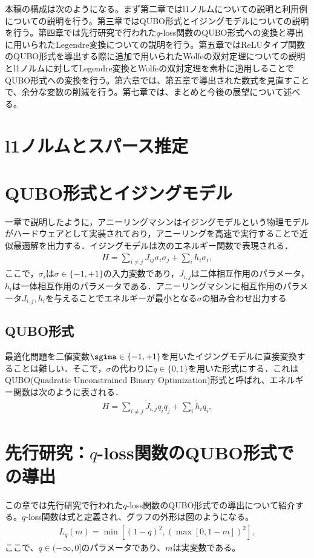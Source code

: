 \documentclass[paper]{ieicej}
\begin{document}
本稿の構成は次のようになる。まず第二章ではl1ノルムについての説明と利用例についての説明を行う。第三章ではQUBO形式とイジングモデルについての説明を行う。第四章では先行研究で行われた$q$-loss関数のQUBO形式への変換と導出に用いられたLegendre変換についての説明を行う。第五章ではReLUタイプ関数のQUBO形式を導出する際に追加で用いられたWolfeの双対定理についての説明とl1ノルムに対してLegendre変換とWolfeの双対定理を素朴に適用しることでQUBO形式への変換を行う。第六章では、第五章で導出された数式を見直すことで、余分な変数の削減を行う。第七章では、まとめと今後の展望について述べる。


\section{l1ノルムとスパース推定}
\section{QUBO形式とイジングモデル}
一章で説明したように，アニーリングマシンはイジングモデルという物理モデルがハードウェアとして実装されており，アニーリングを高速で実行することで近似最適解を出力する．イジングモデルは次のエネルギー関数で表現される．
\begin{eqnarray}
 H = \sum_{i\neq j}{J_{ij}\sigma_{i}\sigma_{j}}+\sum_{i}{h_{i}\sigma_{i}}, \label{Ising_model}
\end{eqnarray}
ここで，$\sigma_{i}$は$\sigma\in\{-1,+1\}$の入力変数であり，$J_{i,j}$は二体相互作用のパラメータ，$h_{i}$は一体相互作用のパラメータである．アニーリングマシンに相互作用のパラメータ$J_{i,j},h_{i}$を与えることでエネルギーが最小となる$\sigma$の組み合わせ出力する
\subsection{QUBO形式}
最適化問題を二値変数$\sgima\in\{-1,+1\}$を用いたイジングモデルに直接変換することは難しい．そこで，$\sigma$の代わりに$q\in\{0,1\}$を用いた形式にする．これはQUBO(Quadratic Unconstrained Binary Optimization)形式と呼ばれ、エネルギー関数は次のように表される．
\begin{eqnarray}
 H = \sum_{i\neq j}{\widetilde{J}_{i,j}q_{i}q_{j}}+\sum_{i}{\widetilde{h}_{i}q_{i}}, \label{QUBO_model}
\end{eqnarray}

\section{先行研究：$q$-loss関数のQUBO形式での導出}
この章では先行研究で行われた$q$-loss関数のQUBO形式での導出について紹介する。$q$-loss関数は式と定義され、グラフの外形は図のようになる。
\begin{eqnarray}
 L_{q}(m) = \min{[(1-q)^{2},(\max{[0,1-m]})^{2}]},
\end{eqnarray}
ここで、$q\in(-\infty,0]$のパラメータであり、$m$は実変数である。
\end{document}
